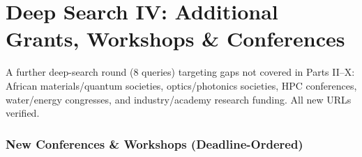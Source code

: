 \documentclass[11pt,a4paper]{article}
\begin{document}


\newpage
\part{Deep Search IV: Additional Grants, Workshops \& Conferences}
\label{part:deep4}

\noindent A further deep-search round (8 queries) targeting gaps not covered in Parts II--X: African materials/quantum societies, optics/photonics societies, HPC conferences, water/energy congresses, and industry/academy research funding. All new URLs verified.

\section{New Conferences \& Workshops (Deadline-Ordered)}
\end{document}

